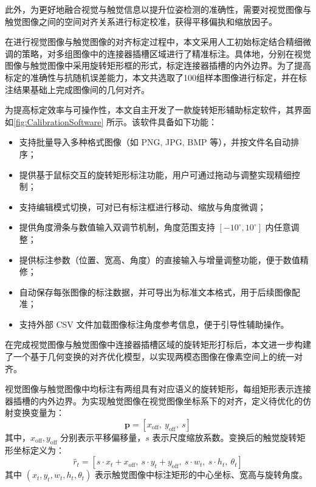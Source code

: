 \documentclass{Diploma}
\begin{document}
此外，为更好地融合视觉与触觉信息以提升位姿检测的准确性，需要对视觉图像与触觉图像之间的空间对齐关系进行标定校准，获得平移偏执和缩放因子。

在进行视觉图像与触觉图像的对齐标定过程中，本文采用人工初始标定结合精细微调的策略，对多组图像中的连接器插槽区域进行了精准标注。具体地，分别在视觉图像与触觉图像中采用旋转矩形框的形式，标定连接器插槽的内外边界。为了提高标定的准确性与抗随机误差能力，本文共选取了100组样本图像进行标定，并在标注结果基础上完成图像间的几何对齐。

为提高标定效率与可操作性，本文自主开发了一款旋转矩形辅助标定软件，其界面如\ref{fig:CalibrationSoftware} 所示。该软件具备如下功能：

%

\begin{itemize}
  \item 支持批量导入多种格式图像（如 PNG, JPG, BMP 等），并按文件名自动排序；
  \item 提供基于鼠标交互的旋转矩形标注功能，用户可通过拖动与调整实现精细控制；
  \item 支持编辑模式切换，可对已有标注框进行移动、缩放与角度微调；
  \item 提供角度滑条与数值输入双调节机制，角度范围支持 $[-10^{\circ}, 10^{\circ}]$ 内任意调整；
  \item 提供标注参数（位置、宽高、角度）的直接输入与增量调整功能，便于数值精修；
  \item 自动保存每张图像的标注数据，并可导出为标准文本格式，用于后续图像配准；
  \item 支持外部 CSV 文件加载图像标注角度参考信息，便于引导性辅助操作。
\end{itemize}


在完成视觉图像与触觉图像中连接器插槽区域的旋转矩形打标后，本文进一步构建了一个基于几何变换的对齐优化模型，以实现两模态图像在像素空间上的统一对齐。

视觉图像与触觉图像中均标注有两组具有对应语义的旋转矩形，每组矩形表示连接器插槽的内外边界。为实现触觉图像在视觉图像坐标系下的对齐，定义待优化的仿射变换变量为：
\begin{equation}
\boldsymbol{p} = \left[x_{\mathrm{off}},\ y_{\mathrm{off}},\ s \right]
\label{eq:transformation_parameters}
\end{equation}
其中，$x_{\mathrm{off}}, y_{\mathrm{off}}$ 分别表示平移偏移量，$s$ 表示尺度缩放系数。变换后的触觉旋转矩形坐标定义为：
\begin{equation}
\hat{r}_t = 
\left[
s \cdot x_t + x_{\mathrm{off}},\ 
s \cdot y_t + y_{\mathrm{off}},\ 
s \cdot w_t,\ 
s \cdot h_t,\ 
\theta_t
\right]
\label{eq:transformed_rect}
\end{equation}
其中 $(x_t, y_t, w_t, h_t, \theta_t)$ 表示触觉图像中标注矩形的中心坐标、宽高与旋转角度。
\end{document}
